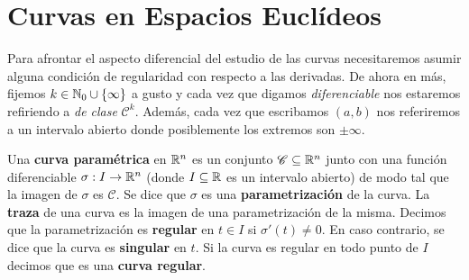 \section{Curvas en Espacios Euclídeos}

Para afrontar el aspecto diferencial del estudio de las curvas necesitaremos asumir alguna condición de regularidad con respecto a las derivadas. De ahora en más, fijemos $k\in \mathbb{N}_0\cup\{\infty\}$ a gusto y cada vez que digamos \textit{diferenciable} nos estaremos refiriendo a \textit{de clase} $\mathscr{C}^k$. Además, cada vez que escribamos $(a,b)$ nos referiremos a un intervalo abierto donde posiblemente los extremos son $\pm\infty$.

\begin{defn}
Una \textbf{curva paramétrica} en $\mathbb{R}^n$ es un conjunto $\mathscr{C}\subseteq\mathbb{R}^n$ junto con una función diferenciable $\sigma:I\to\mathbb{R}^n$ (donde $I\subseteq\mathbb{R}$ es un intervalo abierto) de modo tal que la imagen de $\sigma$ es $\mathscr{C}$. Se dice que $\sigma$ es una \textbf{parametrización} de la curva. La \textbf{traza} de una curva es la imagen de una parametrización de la misma. Decimos que la parametrización es \textbf{regular} en $t\in I$ si $\sigma'(t)\neq 0$. En caso contrario, se dice que la curva es \textbf{singular} en $t$. Si la curva es regular en todo punto de $I$ decimos que es una \textbf{curva regular}.
\end{defn}

